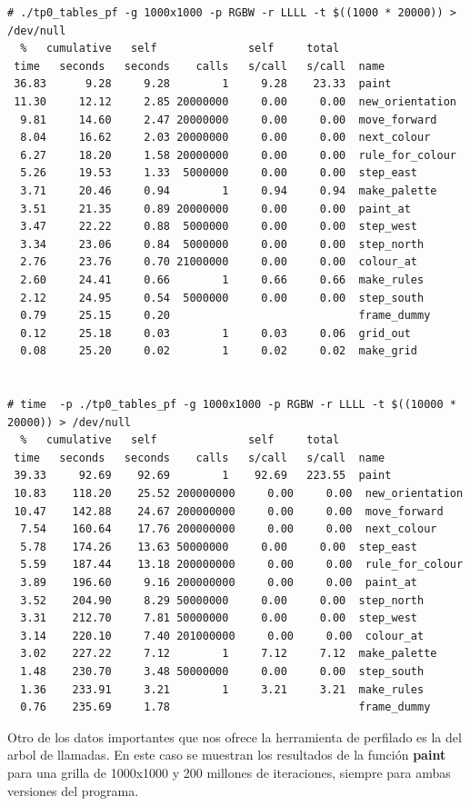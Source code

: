 \documentclass[a4paper, 10pt, twoside, notitlepage]{article}
\begin{document}
\begin{verbatim}
# ./tp0_tables_pf -g 1000x1000 -p RGBW -r LLLL -t $((1000 * 20000)) > /dev/null
  %   cumulative   self              self     total           
 time   seconds   seconds    calls   s/call   s/call  name    
 36.83      9.28     9.28        1     9.28    23.33  paint
 11.30     12.12     2.85 20000000     0.00     0.00  new_orientation
  9.81     14.60     2.47 20000000     0.00     0.00  move_forward
  8.04     16.62     2.03 20000000     0.00     0.00  next_colour
  6.27     18.20     1.58 20000000     0.00     0.00  rule_for_colour
  5.26     19.53     1.33  5000000     0.00     0.00  step_east
  3.71     20.46     0.94        1     0.94     0.94  make_palette
  3.51     21.35     0.89 20000000     0.00     0.00  paint_at
  3.47     22.22     0.88  5000000     0.00     0.00  step_west
  3.34     23.06     0.84  5000000     0.00     0.00  step_north
  2.76     23.76     0.70 21000000     0.00     0.00  colour_at
  2.60     24.41     0.66        1     0.66     0.66  make_rules
  2.12     24.95     0.54  5000000     0.00     0.00  step_south
  0.79     25.15     0.20                             frame_dummy
  0.12     25.18     0.03        1     0.03     0.06  grid_out
  0.08     25.20     0.02        1     0.02     0.02  make_grid


# time  -p ./tp0_tables_pf -g 1000x1000 -p RGBW -r LLLL -t $((10000 * 20000)) > /dev/null
  %   cumulative   self              self     total           
 time   seconds   seconds    calls   s/call   s/call  name    
 39.33     92.69    92.69        1    92.69   223.55  paint
 10.83    118.20    25.52 200000000     0.00     0.00  new_orientation
 10.47    142.88    24.67 200000000     0.00     0.00  move_forward
  7.54    160.64    17.76 200000000     0.00     0.00  next_colour
  5.78    174.26    13.63 50000000     0.00     0.00  step_east
  5.59    187.44    13.18 200000000     0.00     0.00  rule_for_colour
  3.89    196.60     9.16 200000000     0.00     0.00  paint_at
  3.52    204.90     8.29 50000000     0.00     0.00  step_north
  3.31    212.70     7.81 50000000     0.00     0.00  step_west
  3.14    220.10     7.40 201000000     0.00     0.00  colour_at
  3.02    227.22     7.12        1     7.12     7.12  make_palette
  1.48    230.70     3.48 50000000     0.00     0.00  step_south
  1.36    233.91     3.21        1     3.21     3.21  make_rules
  0.76    235.69     1.78                             frame_dummy

\end{verbatim}
\normalsize

\newpage
Otro de los datos importantes que nos ofrece la herramienta de perfilado es la del arbol de llamadas. En este caso se muestran los resultados de la función \textbf{paint} para una grilla de 1000x1000 y 200 millones de iteraciones, siempre para ambas versiones del programa.
\end{document}
